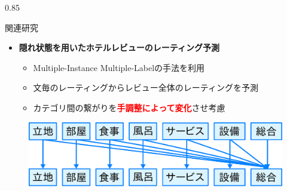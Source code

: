 \documentclass[unicode,10pt]{beamer}
\newlength{\mycolumnwidth}
\newcommand{\itemtitle}[1]{\textbf{#1}\\}
\newcommand{\fire}[1]{\textcolor{red}{\textbf{#1}}}
\begin{document}
\begin{frame}[t]
\begin{columns}[onlytextwidth,t]
\begin{column}{0.85\mycolumnwidth}
  \begin{block}{関連研究}
    \begin{itemize}
      \item \itemtitle{隠れ状態を用いたホテルレビューのレーティング予測
                       \cite{fujitani15}}
        \begin{itemize}
          \item Multiple-Instance Multiple-Labelの手法を利用
          \item 文毎のレーティングからレビュー全体のレーティングを予測
          \item カテゴリ間の繋がりを\fire{手調整によって変化}させ考慮
        \end{itemize}
    \end{itemize}

    \begin{figure}
      \includegraphics[width=0.7\linewidth]
          {fig/fujitani_miml_relations_among_rating_categories.pdf}
    \end{figure}


\end{block}
\end{column}
\end{columns}
\end{frame}
\end{document}
